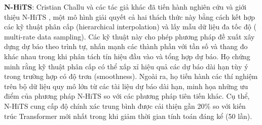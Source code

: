 \par
\textbf{N-HiTS}: Cristian Challu và các tác giả khác đã tiến hành nghiên cứu và giới thiệu N-HiTS \cite{b8}, một mô hình giải quyết cả hai thách thức này bằng cách kết hợp các kỹ thuật phân cấp (hierarchical interpolation) và lấy mẫu dữ liệu đa tốc độ ( multi-rate data sampling). Các kỹ thuật này cho phép phương pháp đề xuất xây dựng dự báo theo trình tự, nhấn mạnh các thành phần với tần số và thang đo khác nhau trong khi phân tách tín hiệu đầu vào và tổng hợp dự báo. Họ chứng minh rằng kỹ thuật phân cấp có thể xấp xỉ hiệu quả các dự báo dài hạn tùy ý trong trường hợp có độ trơn (smoothness). Ngoài ra, họ tiến hành các thí nghiệm trên bộ dữ liệu quy mô lớn từ các tài liệu dự báo dài hạn, minh họa những ưu điểm của phương pháp N-HiTS so với các phương pháp tiên tiến khác. Cụ thể, N-HiTS cung cấp độ chính xác trung bình được cải thiện gần 20\% so với kiến trúc Transformer mới nhất trong khi giảm thời gian tính toán
đáng kể (50 lần).
